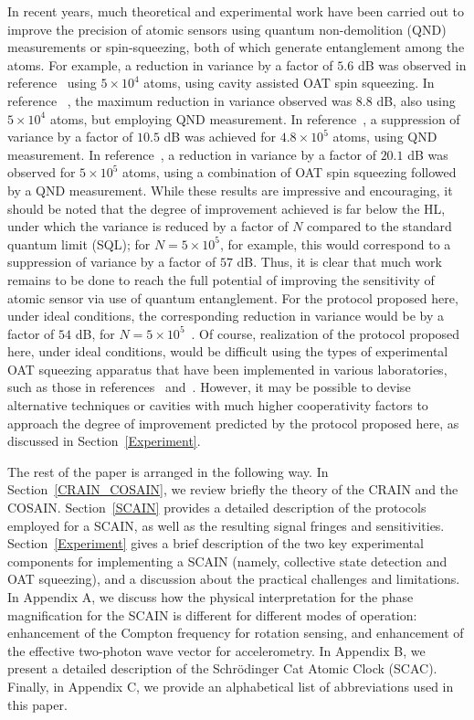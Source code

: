 \documentclass[aps,pra,letterpaper,superscriptaddress,showpacs,amsmath,floats,twocolumn]{revtex4-1}
\begin{document}
In recent years, much theoretical and experimental work have been carried out to improve the precision of atomic sensors using quantum non-demolition (QND) measurements or spin-squeezing, both of which generate entanglement among the atoms. For example, a reduction in variance by a factor of $5.6$ dB was observed in reference~\cite{Leroux1} using $5 \times 10^{4}$ atoms, using cavity assisted OAT spin squeezing. In reference ~\cite{Monika}, the maximum reduction in variance observed was $8.8$ dB, also using $5 \times 10^{4}$ atoms, but employing QND measurement.  In reference~\cite{Thompson}, a suppression of variance by a factor of $10.5$ dB was achieved for $4.8 \times10^{5}$ atoms, using QND measurement. In reference~\cite{Hosten}, a reduction in variance by a factor of $20.1$ dB was observed for $5 \times 10^{5}$ atoms, using a combination of OAT spin squeezing followed by a QND measurement. While these results are impressive and encouraging, it should be noted that the degree of improvement achieved is far below the HL, under which the variance is reduced by a factor of $N$ compared to the standard quantum limit (SQL); for $N=5 \times 10^{5}$, for example, this would correspond to a suppression of variance by a factor of $57$ dB. Thus, it is clear that much work remains to be done to reach the full potential of improving the sensitivity of atomic sensor via use of quantum entanglement. For the protocol proposed here, under ideal conditions, the corresponding reduction in variance would be by a factor of $54$ dB, for $N=5 \times 10^{5}$~\cite{CommentVariance}. Of course, realization of the protocol proposed here, under ideal conditions, would be difficult using the types of experimental OAT squeezing apparatus that have been implemented in various laboratories, such as those in references~\cite{Leroux1} and~\cite{Hosten}. However, it may be possible to devise alternative techniques or cavities with much higher cooperativity factors to approach the degree of improvement predicted by the protocol proposed here, as discussed in Section~\ref{Experiment}.

The rest of the paper is arranged in the following way. In Section~\ref{CRAIN_COSAIN}, we review briefly the theory of the CRAIN and the COSAIN. Section~\ref{SCAIN} provides a detailed description of the protocols employed for a SCAIN, as well as the resulting signal fringes and sensitivities. Section~\ref{Experiment} gives a brief description of the two key experimental components for implementing a SCAIN (namely, collective state detection and OAT squeezing), and a discussion about the practical challenges and limitations. In Appendix A, we discuss how the physical interpretation for the phase magnification for the SCAIN is different for different modes of operation: enhancement of the Compton frequency for rotation sensing, and enhancement of the effective two-photon wave vector for accelerometry.  In Appendix B, we present a detailed description of the Schr\"odinger Cat Atomic Clock (SCAC). Finally, in Appendix C, we provide an alphabetical list of abbreviations used in this paper.
\end{document}
